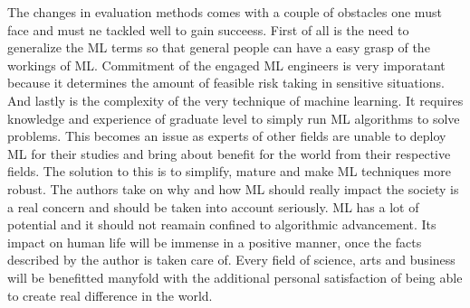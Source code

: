 \documentclass[a4paper,12pt]{article}
\begin{document}
\newline
\indent
The changes in evaluation methods comes with a couple of obstacles one must face and must ne tackled well to gain succeess. First of all is the need to generalize the ML terms so that general people can have a easy grasp of the workings of ML. Commitment of the engaged ML engineers is very imporatant because it determines the amount of feasible risk taking in sensitive situations. And lastly is the complexity of the very technique of machine learning. It requires knowledge and experience of graduate level to simply run ML algorithms to solve problems. This becomes an issue as experts of other fields are unable to deploy ML for their studies and bring about benefit for the world from their respective fields. The solution to this is to simplify, mature and make ML techniques more robust.
\newline
\indent
The authors take on why and how ML should really impact the society is a real concern and should be taken into account seriously. ML has a lot of potential and it should not reamain confined to algorithmic advancement. Its impact on human life will be immense in a positive manner, once the facts described by the author is taken care of. Every field of science, arts and business will be benefitted manyfold with the additional personal satisfaction of being able to create real difference in the world.
\end{document}

